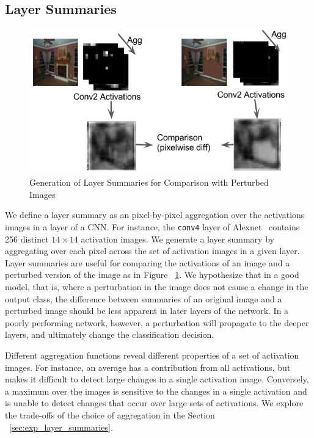 \subsection{Layer Summaries}
\label{ss:layer_summaries}

\begin{figure}[b]
\centering
\includegraphics[width=\columnwidth]{figures/layer_summary/layer_summary_fig}
\caption{Generation of Layer Summaries for Comparison with Perturbed Images}

\label{fig:layer_summary_fig}
\end{figure}

We define a layer summary as an pixel-by-pixel aggregation over the activations images in a layer of a CNN. For instance, the \texttt{conv4} layer of Alexnet~\cite{alexnet} contains 256 distinct $14 \times 14$ activation images. We generate a layer summary by aggregating over each pixel across the set of activation images in a given layer. Layer summaries are useful for comparing the activations of an image and a perturbed version of the image as in Figure ~\ref{fig:layer_summary_fig}. We hypothesize that in a good model, that is, where a perturbation in the image does not cause a change in the output class, the difference between summaries of an original image and a perturbed image should be less apparent in later layers of the network. In a poorly performing network, however, a perturbation will propagate to the deeper layers, and ultimately change the classification decision. 

Different aggregation functions reveal different properties of a set of activation images. For instance, an average has a contribution from all activations, but makes it difficult to detect large changes in a single activation image. Conversely, a maximum over the images is sensitive to the changes in a single activation and is unable to detect changes that occur over large sets of activations. We explore the trade-offs of the choice of aggregation in the Section ~\ref{sec:exp_layer_summaries}.
